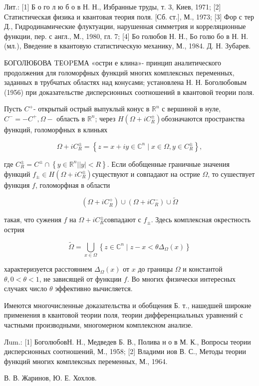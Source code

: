 \documentclass[10pt]{article}
\begin{document}
Лит.: [1] Б о го л ю б о в Н. Н., Избранные труды, т. 3, Киев, 1971; [2] Статистическая физика и квантовая теория поля. [Сб. ст.], М., 1973; [3] Фор с тер Д., Гидродинамические флуктуации, нарушенная симметрия и корреляционные функции, пер. с англ., М., 1980, гл. 7; [4] Бо голюбов Н. Н., Бо голю бо в Н. Н. (мл.), Введение в квантовую статистическую механику, М., 1984. Д. Н. Зубарев.



БОГОЛЮБОВА TЕOPЕМА «остри е клина»- принцип аналитического продолжения для голоморфных функций многих комплексных переменных, заданных в трубчатых областях над конусами; установлена Н. Н. Боголюбовым (1956) при доказательстве дисперсионных соотношений в квантовой теории поля.



Пусть $C^{+}$- открытый острый выпуклый конус в $\mathbb{R}^{n}$ с вершиной в нуле, $C^{-}=-C^{+}, \Omega-$ область в $\mathbb{R}^{n}$; через $H\left(\Omega+i C_{R}^{ \pm}\right)$обозначаются пространства функций, голоморфных в клиньях



\[

\Omega+i C_{R}^{ \pm}=\left\{z=x+i y \in \mathbb{C}^{n} \mid x \in \Omega, y \in C_{R}^{ \pm}\right\},

\]



где $C_{R}^{ \pm}=C^{ \pm} \cap\left\{y \in \mathbb{R}^{n}|| y \mid<R\right\}$. Если обобщенные граничные значения функций $f_{ \pm} \in H\left(\Omega+i C_{R}^{ \pm}\right)$существуют и совпадают на острие $\Omega$, то сушествует функция $f$, голоморфная в области



\[

\left(\Omega+i C_{R}^{+}\right) \cup\left(\Omega+i C_{R}^{-}\right) \cup \tilde{\Omega}

\]



такая, что сужения $f$ на $\Omega+i C_{R}^{ \pm}$совпадают с $f_{ \pm}$. Здесь комплексная окрестность острия



\[

\tilde{\Omega}=\bigcup_{x \in \Omega}\left\{z \in \mathbb{C}^{n} \mid z-x<\theta \Delta_{\Omega}(x)\right\}

\]



характеризуется расстоянием $\Delta_{\Omega}(x)$ от $x$ до границы $\Omega$ и константой $\theta, 0<\theta<1$, не зависящей от функции $f$. Во многих физически интересных случаях число $\theta$ эффективно вычисляется.



Имеются многочисленные доказательства и обобщения Б. т., нашедшей широкие применения в квантовой теории поля, теории дифференциальных уравнений с частными производными, многомерном комплексном анализе.



Лum.: [1] БоголюбовН. Н., Медведев Б. В., Полива н о в М. К., Вопросы теории дисперсионных соотношений, М., 1958; [2] Владими иов В. С., Методы теории функций многих комплексных переменных, М., 1964.



В. В. Жаринов, Ю. Е. Хохлов.
\end{document}
